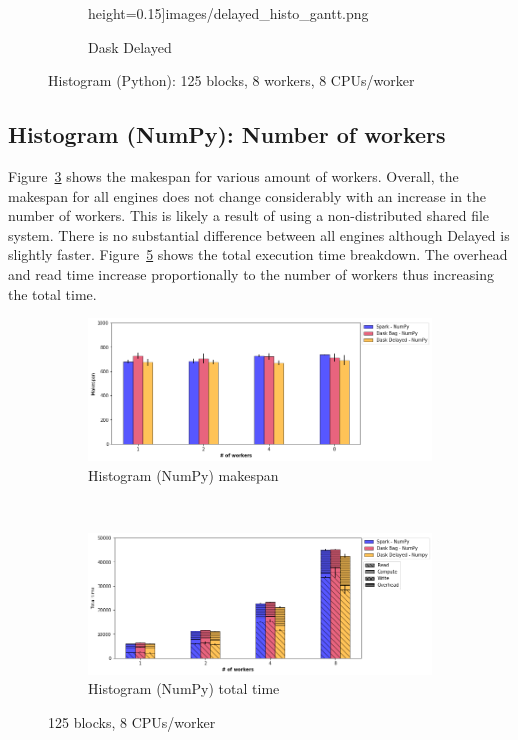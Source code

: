 \documentclass[conference]{IEEEtran}
\begin{document}
\begin{figure}[!t]
\begin{subfigure}[b]{\columnwidth}
        height=0.15\textheight]{images/delayed_histo_gantt.png}%
        \caption{Dask Delayed}\label{fig:histo_dask_delayed_gantt}
    \end{subfigure}
    \caption{Histogram (Python): 125 blocks, 8 workers, 8
    CPUs/worker}\label{fig:histo_gantt}
\end{figure}

\subsection{Histogram (NumPy): Number of workers}
Figure~\ref{fig:histo_np_ms_worker} shows the makespan for various amount of workers.
Overall, the makespan for all engines does not change considerably with an increase
in the number of workers. This is likely a result of using a non-distributed
shared file system. There is no
substantial difference between all engines although Delayed is slightly faster.
Figure~\ref{fig:histo_np_tt_worker} shows the total execution time
breakdown. The overhead and read time increase proportionally to the number
of workers thus increasing the total time. 

\begin{figure}[!b]
    \centering
    \begin{subfigure}[b]{\columnwidth}
        \includegraphics[clip,width=\columnwidth]{images/histo_np_worker.png}%
        \caption{Histogram (NumPy) makespan}\label{fig:histo_np_ms_worker}
    \end{subfigure}
    \\
    \begin{subfigure}[b]{\columnwidth}
        \includegraphics[clip,width=\columnwidth]{images/histo_idle_np_worker.png}%
        \caption{Histogram (NumPy) total time}\label{fig:histo_np_tt_worker}
    \end{subfigure}
    \caption{125 blocks, 8 CPUs/worker}
\end{figure}
\end{document}
